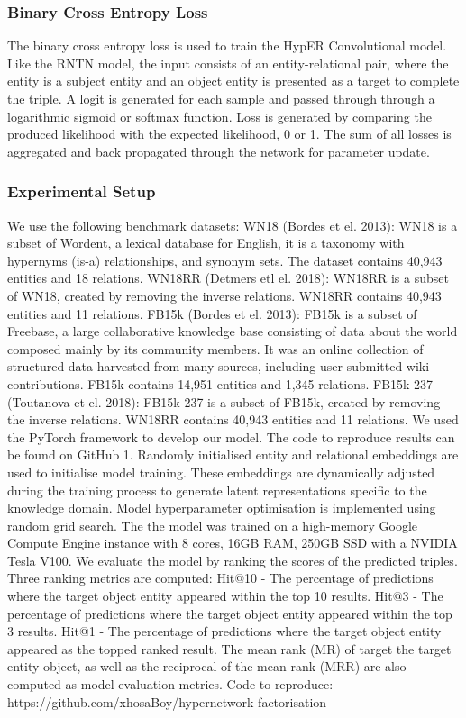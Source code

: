 \subsubsection{Binary Cross Entropy Loss}
The binary cross entropy loss \cite{reference} is used to train the HypER Convolutional model. Like the RNTN model, the input consists of an entity-relational pair, where the entity is a subject entity and an object entity is presented as a target to complete the triple. A logit is generated for each sample and passed through through a logarithmic sigmoid or softmax function. Loss is generated by comparing the produced likelihood with the expected likelihood, 0 or 1. The sum of all losses is aggregated and back propagated through the network for parameter update. \newline

\subsubsection{Experimental Setup} 

We use the following benchmark datasets: WN18 (Bordes et el. 2013): WN18 is a subset of Wordent, a lexical database for English, it is a taxonomy with hypernyms (is-a) relationships, and synonym sets. The dataset contains 40,943 entities and 18 relations. WN18RR (Detmers etl el. 2018): WN18RR is a subset of WN18, created by removing the inverse relations. WN18RR contains 40,943 entities and 11 relations. \newline 
FB15k (Bordes et el. 2013): FB15k is a subset of Freebase, a large collaborative knowledge base consisting of data about the world composed mainly by its community members. It was an online collection of structured data harvested from many sources, including user-submitted wiki contributions. FB15k contains 14,951 entities and 1,345 relations. FB15k-237 (Toutanova et el. 2018): FB15k-237 is a subset of FB15k, created by removing the inverse relations. WN18RR contains 40,943 entities and 11 relations. \newline
We used the PyTorch framework to develop our model. The code to reproduce results can be found on GitHub 1. Randomly initialised entity and relational embeddings are used to initialise model training. These embeddings are dynamically adjusted during the training process to generate latent representations specific to the knowledge domain. Model hyperparameter optimisation is implemented using random grid search. The the model was trained on a high-memory Google Compute Engine instance with 8 cores, 16GB RAM, 250GB SSD with a NVIDIA Tesla V100. \newline
We evaluate the model by ranking the scores of the predicted triples. Three ranking metrics are computed: Hit@10 - The percentage of predictions where the target object entity appeared within the top 10 results. Hit@3 - The percentage of predictions where the target object entity appeared within the top 3 results. Hit@1 - The percentage of predictions where the target object entity appeared as the topped ranked result. The mean rank (MR) of target the target entity object, as well as the reciprocal of the mean rank (MRR) are also computed as model evaluation metrics. Code to reproduce: https://github.com/xhosaBoy/hypernetwork-factorisation

